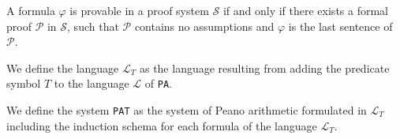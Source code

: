 \begin{definition}[provability]
    \label{def:provable-pa}
    A formula $\varphi$ is provable in a proof system $\mathcal{S}$ if and only if there exists a formal proof $\mathcal{P}$ in $\mathcal{S}$, such that $\mathcal{P}$ contains no assumptions and $\varphi$ is the last sentence of $\mathcal{P}$.
\end{definition}

\begin{definition}[$\mathcal{L}_T$]
    \label{def:LT}
    We define the language $\mathcal{L}_T$ as the language resulting from adding the predicate symbol $T$ to the language $\mathcal{L}$ of \texttt{PA}. 
\end{definition}

\begin{definition}
    \label{def:PAT}
    We define the system \texttt{PAT} as the system of Peano arithmetic formulated in $\mathcal{L}_T$ including the induction schema for each formula of the language $\mathcal{L}_T$.
\end{definition}
